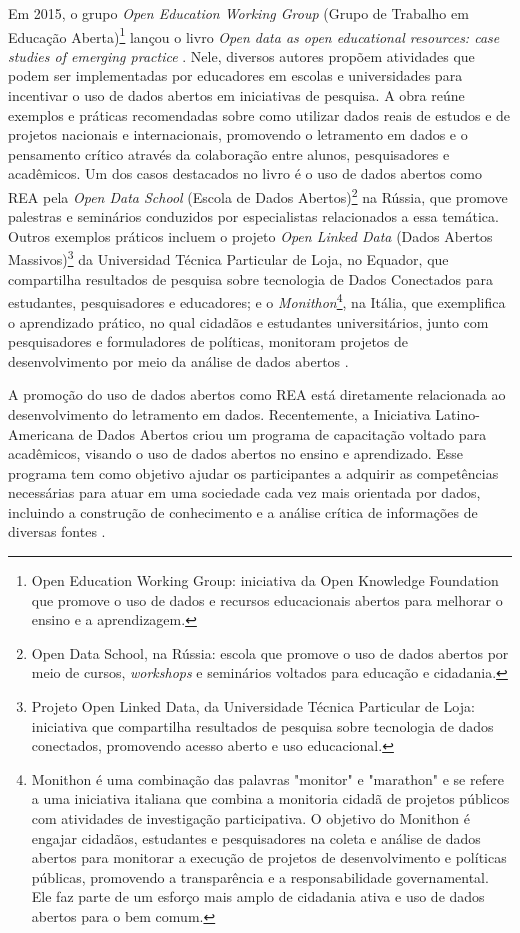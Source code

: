 \documentclass[portuguese]{textolivre}
\begin{document}
Em 2015, o grupo \textit{Open Education Working Group} (Grupo de Trabalho em Educação Aberta)\footnote{Open Education Working Group: iniciativa da Open Knowledge Foundation que promove o uso de dados e recursos educacionais abertos para melhorar o ensino e a aprendizagem.} lançou o livro \textit{Open data as open educational resources: case studies of emerging practice} \cite{atenas2015}. Nele, diversos autores propõem atividades que podem ser implementadas por educadores em escolas e universidades para incentivar o uso de dados abertos em iniciativas de pesquisa. A obra reúne exemplos e práticas recomendadas sobre como utilizar dados reais de estudos e de projetos nacionais e internacionais, promovendo o letramento em dados e o pensamento crítico através da colaboração entre alunos, pesquisadores e acadêmicos. Um dos casos destacados no livro é o uso de dados abertos como REA pela \textit{Open Data School} (Escola de Dados Abertos)\footnote{Open Data School, na Rússia: escola que promove o uso de dados abertos por meio de cursos, \textit{workshops} e seminários voltados para educação e cidadania.} na Rússia, que promove palestras e seminários conduzidos por especialistas relacionados a essa temática. Outros exemplos práticos incluem o projeto \textit{Open Linked Data} (Dados Abertos Massivos)\footnote{Projeto Open Linked Data, da Universidade Técnica Particular de Loja: iniciativa que compartilha resultados de pesquisa sobre tecnologia de dados conectados, promovendo acesso aberto e uso educacional.} da Universidad Técnica Particular de Loja, no Equador, que compartilha resultados de pesquisa sobre tecnologia de Dados Conectados para estudantes, pesquisadores e educadores; e o \textit{Monithon}\footnote{Monithon é uma combinação das palavras "monitor" e "marathon" e se refere a uma iniciativa italiana que combina a monitoria cidadã de projetos públicos com atividades de investigação participativa. O objetivo do Monithon é engajar cidadãos, estudantes e pesquisadores na coleta e análise de dados abertos para monitorar a execução de projetos de desenvolvimento e políticas públicas, promovendo a transparência e a responsabilidade governamental. Ele faz parte de um esforço mais amplo de cidadania ativa e uso de dados abertos para o bem comum.}, na Itália, que exemplifica o aprendizado prático, no qual cidadãos e estudantes universitários, junto com pesquisadores e formuladores de políticas, monitoram projetos de desenvolvimento por meio da análise de dados abertos \cite{atenas2019}.

A promoção do uso de dados abertos como REA está diretamente relacionada ao desenvolvimento do letramento em dados. Recentemente, a Iniciativa Latino-Americana de Dados Abertos criou um programa de capacitação voltado para acadêmicos, visando o uso de dados abertos no ensino e aprendizado. Esse programa tem como objetivo ajudar os participantes a adquirir as competências necessárias para atuar em uma sociedade cada vez mais orientada por dados, incluindo a construção de conhecimento e a análise crítica de informações de diversas fontes \cite{atenas2019}.
\end{document}
